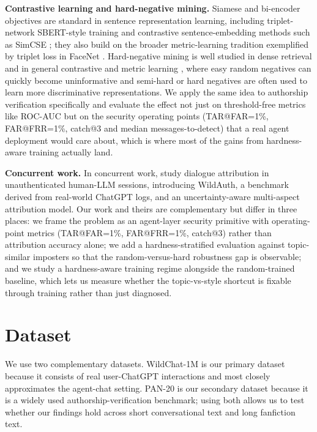 \documentclass[11pt]{article}
\begin{document}
\noindent\textbf{Contrastive learning and hard-negative mining.} Siamese and bi-encoder objectives are standard in sentence representation learning, including triplet-network SBERT-style training \citep{reimers2019sentencebert} and contrastive sentence-embedding methods such as SimCSE \citep{gao2021simcse}; they also build on the broader metric-learning tradition exemplified by triplet loss in FaceNet \citep{schroff2015facenet}. Hard-negative mining is well studied in dense retrieval \citep{xiong2021ance} and in general contrastive and metric learning \citep{robinson2021hard,schroff2015facenet}, where easy random negatives can quickly become uninformative and semi-hard or hard negatives are often used to learn more discriminative representations. We apply the same idea to authorship verification specifically and evaluate the effect not just on threshold-free metrics like ROC-AUC but on the security operating points (TAR@FAR=1\%, FAR@FRR=1\%, catch@3 and median messages-to-detect) that a real agent deployment would care about, which is where most of the gains from hardness-aware training actually land.

\noindent\textbf{Concurrent work.} In concurrent work, \citet{shen2026chatbot} study dialogue attribution in unauthenticated human-LLM sessions, introducing WildAuth, a benchmark derived from real-world ChatGPT logs, and an uncertainty-aware multi-aspect attribution model. Our work and theirs are complementary but differ in three places: we frame the problem as an agent-layer security primitive with operating-point metrics (TAR@FAR=1\%, FAR@FRR=1\%, catch@3) rather than attribution accuracy alone; we add a hardness-stratified evaluation against topic-similar imposters so that the random-versus-hard robustness gap is observable; and we study a hardness-aware training regime alongside the random-trained baseline, which lets us measure whether the topic-vs-style shortcut is fixable through training rather than just diagnosed.

\section{Dataset}
\label{sec:dataset}

We use two complementary datasets. WildChat-1M \citep{zhao2024wildchat} is our primary dataset because it consists of real user-ChatGPT interactions and most closely approximates the agent-chat setting. PAN-20 \citep{bevendorff2020overview} is our secondary dataset because it is a widely used authorship-verification benchmark; using both allows us to test whether our findings hold across short conversational text and long fanfiction text.
\end{document}
